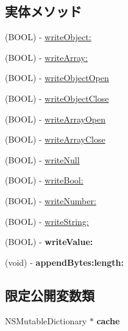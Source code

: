 \subsection*{実体メソッド}
\begin{DoxyCompactItemize}
\item 
(B\+O\+O\+L) -\/ \hyperlink{interface_s_b_json_stream_writer_a561990f7d890ffdafdc3f682cacc7211}{write\+Object\+:}
\item 
(B\+O\+O\+L) -\/ \hyperlink{interface_s_b_json_stream_writer_a781a94592da7317105844dfc8c6706cc}{write\+Array\+:}
\item 
(B\+O\+O\+L) -\/ \hyperlink{interface_s_b_json_stream_writer_ab9ff056f3f9f3ad5614163bcf194bbec}{write\+Object\+Open}
\item 
(B\+O\+O\+L) -\/ \hyperlink{interface_s_b_json_stream_writer_a5d5dae8a7c4c4bf8dd2780afa68cd251}{write\+Object\+Close}
\item 
(B\+O\+O\+L) -\/ \hyperlink{interface_s_b_json_stream_writer_aafa9f94cb852d1feda150e327ead8214}{write\+Array\+Open}
\item 
(B\+O\+O\+L) -\/ \hyperlink{interface_s_b_json_stream_writer_afc0ed996a7782780750202e639ce9846}{write\+Array\+Close}
\item 
(B\+O\+O\+L) -\/ \hyperlink{interface_s_b_json_stream_writer_a1e8475e49f5d0077d24c270e733f1841}{write\+Null}
\item 
(B\+O\+O\+L) -\/ \hyperlink{interface_s_b_json_stream_writer_ae15932d9181ad5276806adad55c7dc53}{write\+Bool\+:}
\item 
(B\+O\+O\+L) -\/ \hyperlink{interface_s_b_json_stream_writer_a888ca10428bf36470a4abe767cbec6e3}{write\+Number\+:}
\item 
(B\+O\+O\+L) -\/ \hyperlink{interface_s_b_json_stream_writer_a9acd747325bacc643f4830619d4c1139}{write\+String\+:}
\item 
\hypertarget{interface_s_b_json_stream_writer_ad07ba844e4c471660daf9b5dfcb43e8e}{}(B\+O\+O\+L) -\/ {\bfseries write\+Value\+:}\label{interface_s_b_json_stream_writer_ad07ba844e4c471660daf9b5dfcb43e8e}

\item 
\hypertarget{interface_s_b_json_stream_writer_a27c7af220a32b2dedd15106e435a7df9}{}(void) -\/ {\bfseries append\+Bytes\+:length\+:}\label{interface_s_b_json_stream_writer_a27c7af220a32b2dedd15106e435a7df9}

\end{DoxyCompactItemize}
\subsection*{限定公開変数類}
\begin{DoxyCompactItemize}
\item 
\hypertarget{interface_s_b_json_stream_writer_a6ffa204ce430d6d2d6566d3267ccf085}{}N\+S\+Mutable\+Dictionary $\ast$ {\bfseries cache}\label{interface_s_b_json_stream_writer_a6ffa204ce430d6d2d6566d3267ccf085}

\end{DoxyCompactItemize}
